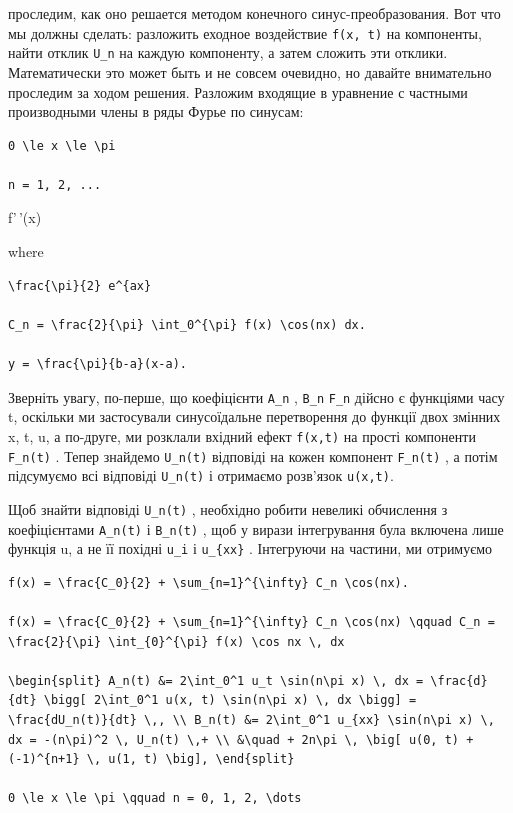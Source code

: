 \documentclass[
  ukrainian,
]{article}
\begin{document}
проследим, как оно решается методом конечного синус-преобразования. Вот
что мы должны сделать: разложить еходное воздействие \texttt{f(x,\ t)}
на компоненты, найти отклик \texttt{U\_n} на каждую компоненту, а затем
сложить эти отклики. Математически это может быть и не совсем очевидно,
но давайте внимательно проследим за ходом решения. Разложим входящие в
уравнение с частными производными члены в ряды Фурье по синусам:

\begin{verbatim}
0 \le x \le \pi

n = 1, 2, ...
\end{verbatim}

f'\,'(x)

where

\begin{verbatim}
\frac{\pi}{2} e^{ax}

C_n = \frac{2}{\pi} \int_0^{\pi} f(x) \cos(nx) dx.

y = \frac{\pi}{b-a}(x-a).
\end{verbatim}

Зверніть увагу, по-перше, що коефіцієнти \texttt{A\_n} , \texttt{B\_n}
\texttt{F\_n} дійсно є функціями часу t, оскільки ми застосували
синусоїдальне перетворення до функції двох змінних x, t, u, а по-друге,
ми розклали вхідний ефект \texttt{f(x,t)} на прості компоненти
\texttt{F\_n(t)} . Тепер знайдемо \texttt{U\_n(t)} відповіді на кожен
компонент \texttt{F\_n(t)} , а потім підсумуємо всі відповіді
\texttt{U\_n(t)} і отримаємо розв'язок \texttt{u(x,t)}.

Щоб знайти відповіді \texttt{U\_n(t)} , необхідно робити невеликі
обчислення з коефіцієнтами \texttt{A\_n(t)} і \texttt{B\_n(t)} , щоб у
вирази інтегрування була включена лише функція u, а не її похідні
\texttt{u\_i} і \texttt{u\_\{xx\}} . Інтегруючи на частини, ми отримуємо

\begin{verbatim}
f(x) = \frac{C_0}{2} + \sum_{n=1}^{\infty} C_n \cos(nx).

f(x) = \frac{C_0}{2} + \sum_{n=1}^{\infty} C_n \cos(nx) \qquad C_n = \frac{2}{\pi} \int_{0}^{\pi} f(x) \cos nx \, dx

\begin{split} A_n(t) &= 2\int_0^1 u_t \sin(n\pi x) \, dx = \frac{d}{dt} \bigg[ 2\int_0^1 u(x, t) \sin(n\pi x) \, dx \bigg] = \frac{dU_n(t)}{dt} \,, \\ B_n(t) &= 2\int_0^1 u_{xx} \sin(n\pi x) \, dx = -(n\pi)^2 \, U_n(t) \,+ \\ &\quad + 2n\pi \, \big[ u(0, t) + (-1)^{n+1} \, u(1, t) \big], \end{split}

0 \le x \le \pi \qquad n = 0, 1, 2, \dots
\end{verbatim}
\end{document}
